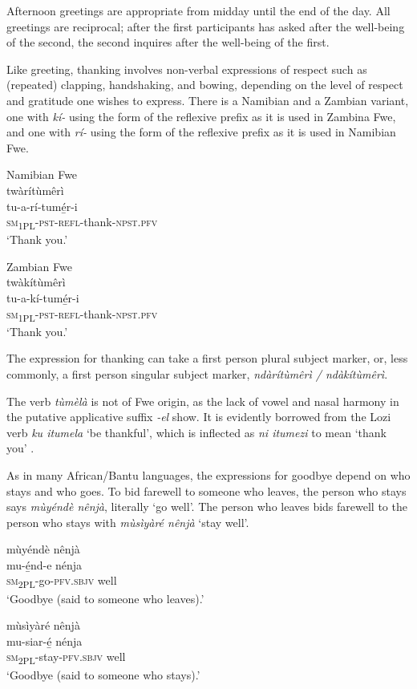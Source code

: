 Afternoon greetings are appropriate from midday until the end of the day. All greetings are reciprocal; after the first participants has asked after the well-being of the second, the second inquires after the well-being of the first.

Like greeting, thanking involves non-verbal expressions of respect such as (repeated) clapping, handshaking, and bowing, depending on the level of respect and gratitude one wishes to express. There is a Namibian and a Zambian variant, one with \textit{kí-} using the form of the reflexive prefix as it is used in Zambina Fwe, and one with \textit{rí-} using the form of the reflexive prefix as it is used in Namibian Fwe.


\ea
Namibian Fwe\\
\glll twàrítùmêrì\\
tu-a-rí-tumé̲r-i\\
\textsc{sm}\textsubscript{1PL}{}-\textsc{pst}{}-\textsc{refl}{}-thank-\textsc{npst}.\textsc{pfv}\\
\glt ‘Thank you.’
\z

\ea
Zambian Fwe\\
\glll twàkítùmêrì\\
tu-a-kí-tumé̲r-i\\
\textsc{sm}\textsubscript{1PL}{}-\textsc{pst}{}-\textsc{refl}{}-thank-\textsc{npst}.\textsc{pfv}\\
\glt ‘Thank you.’
\z



The expression for thanking can take a first person plural subject marker, or, less commonly, a first person singular subject marker, \textit{ndàrítùmêrì / ndàkítùmêrì}.

The verb \textit{tùmèlà} is not of Fwe origin, as the lack of vowel and nasal harmony in the putative applicative suffix \textit{{}-el} show. It is evidently borrowed from the Lozi verb \textit{ku itumela} ‘be thankful’, which is inflected as \textit{ni itumezi} to mean ‘thank you’ \citep{Burger1960}.

As in many African/Bantu languages, the expressions for goodbye depend on who stays and who goes. To bid farewell to someone who leaves, the person who stays says \textit{mùyéndè nênjà}, literally ‘go well’. The person who leaves bids farewell to the person who stays with \textit{mùsìyàré nênjà} ‘stay well’.


\ea
mùyéndè nênjà\\
\gll mu-é̲nd-e    nénja\\
\textsc{sm}\textsubscript{2PL}{}-go-\textsc{pfv}.\textsc{sbjv}  well\\
\glt ‘Goodbye (said to someone who leaves).’
\z

\largerpage[2]
\ea
mùsìyàré nênjà\\
\gll mu-siar-é̲    nénja\\
\textsc{sm}\textsubscript{2PL}{}-stay-\textsc{pfv}.\textsc{sbjv}  well\\
\glt ‘Goodbye (said to someone who stays).’
\z



